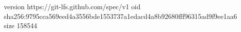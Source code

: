 version https://git-lfs.github.com/spec/v1
oid sha256:9795cca569eed4a3556bde1553737a1edacd4a8b92680fff96315ad9f9ee1aa6
size 158544

